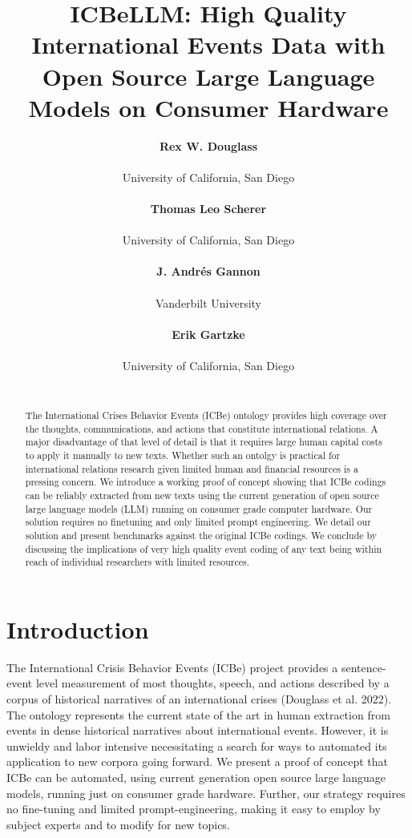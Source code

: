 \documentclass[
]{article}
\title{ICBeLLM: High Quality International Events Data with Open Source
Large Language Models on Consumer Hardware}
\author{\textbf{Rex W. Douglass}\\\\University of California, San
Diego\\\\\asep\textbf{Thomas Leo Scherer}\\\\University of California,
San Diego\\\\\asep\textbf{J. Andrés Gannon}\\\\Vanderbilt
University\\\\\asep\textbf{Erik Gartzke}\\\\University of California,
San Diego\\\\}
\date{}
\begin{document}
\maketitle
\begin{abstract}
The International Crises Behavior Events (ICBe) ontology provides high
coverage over the thoughts, communications, and actions that constitute
international relations. A major disadvantage of that level of detail is
that it requires large human capital costs to apply it manually to new
texts. Whether such an ontolgy is practical for international relations
research given limited human and financial resources is a pressing
concern. We introduce a working proof of concept showing that ICBe
codings can be reliably extracted from new texts using the current
generation of open source large language models (LLM) running on
consumer grade computer hardware. Our solution requires no finetuning
and only limited prompt engineering. We detail our solution and present
benchmarks against the original ICBe codings. We conclude by discussing
the implications of very high quality event coding of any text being
within reach of individual researchers with limited resources.
\end{abstract}

\section{Introduction}\label{introduction}

The International Crisis Behavior Events (ICBe) project provides a
sentence-event level measurement of most thoughts, speech, and actions
described by a corpus of historical narratives of an international
crises (Douglass et al. 2022). The ontology represents the current state
of the art in human extraction from events in dense historical
narratives about international events. However, it is unwieldy and labor
intensive necessitating a search for ways to automated its application
to new corpora going forward. We present a proof of concept that ICBe
can be automated, using current generation open source large language
models, running just on consumer grade hardware. Further, our strategy
requires no fine-tuning and limited prompt-engineering, making it easy
to employ by subject experts and to modify for new topics.
\end{document}
